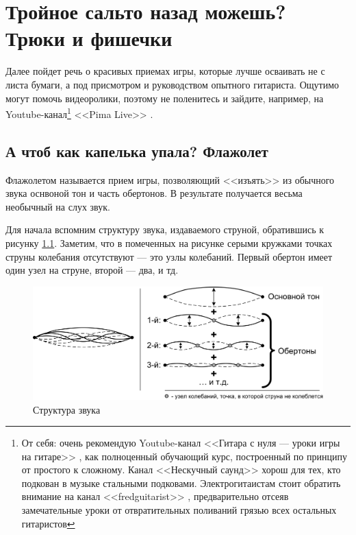 \chapter{Тройное сальто назад можешь? Трюки и фишечки}
\label{ch:tricks}

Далее пойдет речь о красивых приемах игры, которые лучше осваивать не с листа бумаги, а под присмотром и руководством опытного гитариста. Ощутимо могут помочь видеоролики, поэтому не поленитесь и зайдите, например, на Youtube-канал\footnote{От себя: очень рекомендую Youtube-канал <<Гитара с нуля --- уроки игры на гитаре>> \cite{url:guitarFromZero}, как полноценный обучающий курс, построенный по принципу от простого к сложному. Канал <<Нескучный саунд>> \cite{url:funnySound} хорош для тех, кто подкован в музыке стальными подковами. Электрогитаистам стоит обратить внимание на канал <<fredguitarist>> \cite{url:fredguitarist}, предварительно отсеяв замечательные уроки от отвратительных поливаний грязью всех остальных гитаристов} <<Pima Live>> \cite{url:pimalive}.


\section{А чтоб как капелька упала? Флажолет}
\label{ch:tricks:flageolet}

Флажолетом называется прием игры, позволяющий <<изъять>> из обычного звука оснвоной тон и часть обертонов. В результате получается весьма необычный на слух звук.

Для начала вспомним структуру звука, издаваемого струной, обратившись к рисунку \ref{fig:tricks:flageolet:nodes}. Заметим, что в помеченных на рисунке серыми кружками точках струны колебания отсутствуют --- это узлы колебаний. Первый обертон имеет один узел на струне, второй --- два, и тд.

\begin{figure}[!ht]
    \centering
    \includegraphics{fig/string-nodes} 
    \caption{Структура звука}\label{fig:tricks:flageolet:nodes}
\end{figure}

